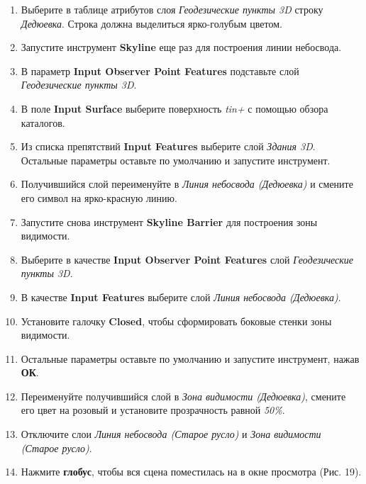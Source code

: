 \documentclass[12pt,]{book}
\begin{document}
\begin{enumerate}
\def\labelenumi{\arabic{enumi}.}
\item
  Выберите в таблице атрибутов слоя \emph{Геодезические пункты 3D} строку \emph{Дедюевка}. Строка должна выделиться ярко-голубым цветом.
\item
  Запустите инструмент \textbf{Skyline} еще раз для построения линии небосвода.
\item
  В параметр \textbf{Input Observer Point Features} подставьте слой \emph{Геодезические пункты 3D}.
\item
  В поле \textbf{Input Surface} выберите поверхность \emph{tin+} с помощью обзора каталогов.
\item
  Из списка препятствий \textbf{Input Features} выберите слой \emph{Здания 3D}. Остальные параметры оставьте по умолчанию и запустите инструмент.
\item
  Получившийся слой переименуйте в \emph{Линия небосвода (Дедюевка)} и смените его символ на ярко-красную линию.
\item
  Запустите снова инструмент \textbf{Skyline Barrier} для построения зоны видимости.
\item
  Выберите в качестве \textbf{Input Observer Point Features} слой \emph{Геодезические пункты 3D}.
\item
  В качестве \textbf{Input Features} выберите слой \emph{Линия небосвода (Дедюевка)}.
\item
  Установите галочку \textbf{Closed}, чтобы сформировать боковые стенки зоны видимости.
\item
  Остальные параметры оставьте по умолчанию и запустите инструмент, нажав \textbf{ОК}.
\item
  Переименуйте получившийся слой в \emph{Зона видимости (Дедюевка)}, смените его цвет на розовый и установите прозрачность равной \emph{50\%}.
\item
  Отключите слои \emph{Линия небосвода (Старое русло)} и \emph{Зона видимости (Старое русло)}.
\item
  Нажмите \textbf{глобус}, чтобы вся сцена поместилась на в окне просмотра (Рис. 19).


\end{enumerate}
\end{document}
